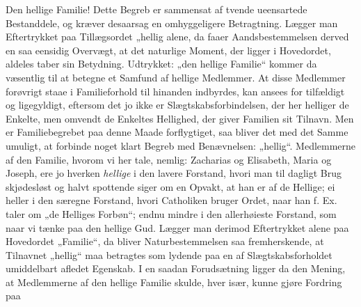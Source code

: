 \documentclass[12pt,a4paper]{book}
\begin{document}
Den hellige Familie! Dette Begreb er sammensat af tvende ueensartede
Bestanddele, og kræver desaarsag en omhyggeligere Betragtning. Lægger man
Eftertrykket paa Tillægsordet „hellig alene, da faaer Aandsbestemmelsen derved
en saa eensidig Overvægt, at det naturlige Moment, der ligger i Hovedordet,
aldeles
taber sin Betydning. Udtrykket: „den hellige Familie“ kommer da væsentlig til at
betegne et Samfund af hellige Medlemmer. At disse Medlemmer forøvrigt staae i
Familieforhold til hinanden indbyrdes, kan ansees for tilfældigt og ligegyldigt,
eftersom det jo ikke er Slægtskabsforbindelsen, der her helliger de Enkelte, men
omvendt de Enkeltes Hellighed, der giver Familien sit Tilnavn. Men er
Familiebegrebet paa denne Maade forflygtiget, saa bliver det med det Samme
umuligt, at forbinde noget klart Begreb med Benævnelsen: „hellig“. Medlemmerne
af den Familie, hvorom vi her tale, nemlig: Zacharias og Elisabeth, Maria og
Joseph, ere jo hverken \emph{hellige} i den lavere Forstand, hvori man til
dagligt Brug skjødesløst og halvt spottende siger om en Opvakt, at han er af de
Hellige; ei heller i den særegne Forstand, hvori Catholiken bruger Ordet, naar
han f. Ex. taler om „de Helliges Forbøn“; endnu mindre i den allerhøieste
Forstand, som naar vi tænke paa den hellige Gud. Lægger man derimod Eftertrykket
alene paa Hovedordet „Familie“, da bliver Naturbestemmelsen saa fremherskende,
at Tilnavnet „hellig“ maa betragtes som lydende paa en af Slægtskabsforholdet
umiddelbart afledet Egenskab. I en saadan Forudsætning ligger da den Mening, at
Medlemmerne af den hellige Familie skulde, hver især, kunne gjøre Fordring paa
\end{document}
